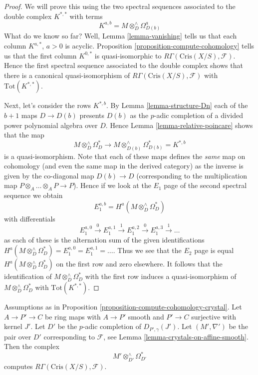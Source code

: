 \begin{proof}
We will prove this using the two spectral sequences associated to the
double complex $K^{*, *}$ with terms
$$
K^{a, b} = M \otimes_D^\wedge \Omega^a_{D(b)}
$$
What do we know so far? Well, Lemma \ref{lemma-vanishing}
tells us that each column $K^{a, *}$, $a > 0$ is acyclic.
Proposition \ref{proposition-compute-cohomology} tells us that
the first column $K^{0, *}$ is quasi-isomorphic to
$R\Gamma(\text{Cris}(X/S), \mathcal{F})$.
Hence the first spectral sequence associated to the double complex
shows that there is a canonical quasi-isomorphism of
$R\Gamma(\text{Cris}(X/S), \mathcal{F})$ with
$\text{Tot}(K^{*, *})$.

\medskip\noindent
Next, let's consider the rows $K^{*, b}$. By
Lemma \ref{lemma-structure-Dn}
each of the $b + 1$ maps $D \to D(b)$ presents $D(b)$ as the $p$-adic
completion of a divided power polynomial algebra over $D$.
Hence Lemma \ref{lemma-relative-poincare} shows that the map
$$
M \otimes^\wedge_D\Omega^*_D
\longrightarrow
M \otimes^\wedge_{D(b)} \Omega^*_{D(b)} = K^{*, b}
$$
is a quasi-isomorphism. Note that each of these maps defines the {\it same}
map on cohomology (and even the same map in the derived category) as
the inverse is given by the co-diagonal map $D(b) \to D$ (corresponding
to the multiplication map $P \otimes_A \ldots \otimes_A P \to P$).
Hence if we look at the $E_1$ page of the second spectral sequence
we obtain
$$
E_1^{a, b} = H^a(M \otimes^\wedge_D\Omega^*_D)
$$
with differentials
$$
E_1^{a, 0} \xrightarrow{0}
E_1^{a, 1} \xrightarrow{1}
E_1^{a, 2} \xrightarrow{0}
E_1^{a, 3} \xrightarrow{1} \ldots
$$
as each of these is the alternation sum of the given identifications
$H^a(M \otimes^\wedge_D\Omega^*_D) = E_1^{a, 0} = E_1^{a, 1} = \ldots$.
Thus we see that the $E_2$ page is equal $H^a(M \otimes^\wedge_D\Omega^*_D)$
on the first row and zero elsewhere. It follows that the identification
of $M \otimes^\wedge_D\Omega^*_D$ with the first row induces a
quasi-isomorphism of $M \otimes^\wedge_D\Omega^*_D$ with
$\text{Tot}(K^{*, *})$.
\end{proof}

\begin{lemma}
\label{lemma-compute-cohomology-crystal-smooth}
Assumptions as in Proposition \ref{proposition-compute-cohomology-crystal}.
Let $A \to P' \to C$ be ring maps with $A \to P'$ smooth and $P' \to C$
surjective with kernel $J'$. Let $D'$ be the $p$-adic completion of
$D_{P', \gamma}(J')$. Let $(M', \nabla')$ be the pair over $D'$
corresponding to $\mathcal{F}$, see
Lemma \ref{lemma-crystals-on-affine-smooth}. Then the complex
$$
M' \otimes^\wedge_{D'} \Omega^*_{D'}
$$
computes $R\Gamma(\text{Cris}(X/S), \mathcal{F})$.
\end{lemma}

